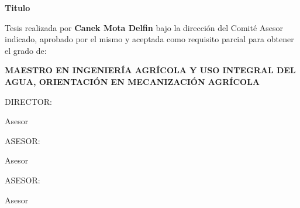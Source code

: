 
\begin{large}
	\begin{center}
		\textbf{Titulo} 
	\end{center}
\end{large}


\vspace{1cm}
Tesis realizada por \textbf{Canek Mota Delfin} bajo la dirección del Comité Asesor indicado, aprobado por el mismo y aceptada como requisito parcial para obtener el grado de:

\vspace{1cm}
 \begin{center}
 	\textbf{MAESTRO EN INGENIERÍA AGRÍCOLA Y USO INTEGRAL DEL AGUA, ORIENTACIÓN EN MECANIZACIÓN AGRÍCOLA}
 \end{center}
\vspace{2cm}

DIRECTOR:\xrfill[1pt]{1pt}
\begin{center}
	Asesor

\end{center}
\vspace{2cm}

ASESOR:\xrfill[1pt]{1pt}
\begin{center}
	Asesor
	
\end{center}
\vspace{2cm}

ASESOR:\xrfill[1pt]{1pt}
\begin{center}
	Asesor
	
\end{center}